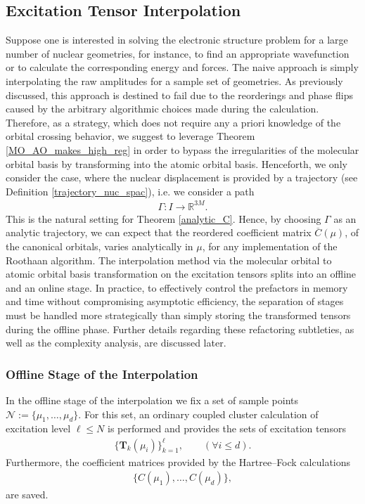 \documentclass[reqno]{amsart}
\begin{document}
\subsection{Excitation Tensor Interpolation}\label{exc_tens_inter} Suppose one is interested in solving the electronic structure problem for a large number of nuclear geometries, for instance, to find an appropriate wavefunction or to calculate the corresponding energy and forces. The naive approach is simply interpolating the raw amplitudes for a sample set of geometries. As previously discussed, this approach is destined to fail due to the reorderings and phase flips caused by the arbitrary algorithmic choices made during the calculation. Therefore, as a strategy, which does not require any a priori knowledge of the orbital crossing behavior, we suggest to leverage Theorem \ref{MO_AO_makes_high_reg} in order to bypass the irregularities of the molecular orbital basis by transforming into the atomic orbital basis. Henceforth, we only consider the case, where the nuclear displacement is provided by a trajectory (see Definition \ref{trajectory_nuc_spac}), i.e. we consider a path
\begin{align}
    \Gamma:I\longrightarrow \mathbb{R}^{3M}.
\end{align}
This is the natural setting for Theorem \ref{analytic_C}. Hence, by choosing $\Gamma$ as an analytic trajectory, we can expect that the reordered coefficient matrix $\overline{C}(\mu)$, of the canonical orbitals, varies analytically in $\mu$, for any implementation of the Roothaan algorithm. The interpolation method via the molecular orbital to atomic orbital basis transformation on the excitation tensors splits into an offline and an online stage. In practice, to effectively control the prefactors in memory and time without compromising asymptotic efficiency, the separation of stages must be handled more strategically than simply storing the transformed tensors during the offline phase. Further details regarding these refactoring subtleties, as well as the complexity analysis, are discussed later. 
\subsubsection{Offline Stage of the Interpolation}\label{offline_stage} In the offline stage of the interpolation we fix a set of sample points $\mathcal{N}:=\lbrace\mu_1,\ldots,\mu_d\rbrace$. For this set, an ordinary coupled cluster calculation of excitation level $\ell\le N$ is performed and provides the sets of excitation tensors
\begin{align}\label{offline_exc_ten}
    \big\lbrace\mathbf{T}_k(\mu_i)\big\rbrace_{k=1}^{\ell},\qquad (\forall i\le d).
\end{align}
Furthermore, the coefficient matrices provided by the Hartree–Fock calculations 
\begin{align}
    \big\lbrace C(\mu_1),\ldots, C(\mu_d)\big\rbrace,
\end{align}
are saved.
\end{document}
